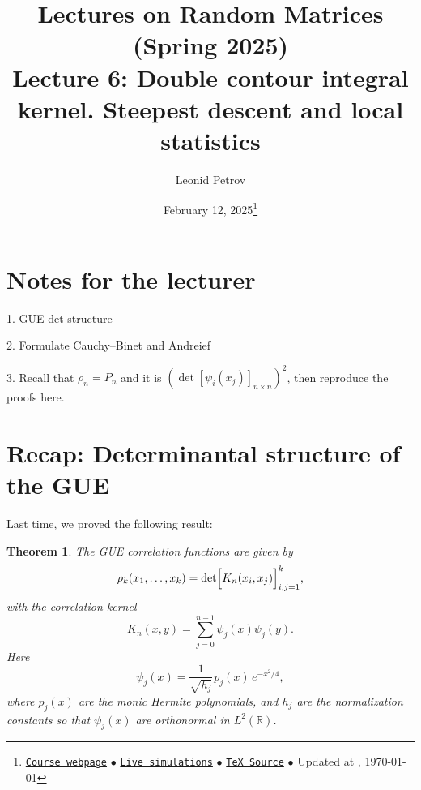 \documentclass[letterpaper,11pt,oneside,reqno]{article}
\numberwithin{equation}{section}
\newcommand{\ssp}{\hspace{1pt}}
\newtheorem{theorem}[proposition]{Theorem}
\theoremstyle{definition}
\newenvironment{lnotes}{\section*{Notes for the lecturer}}{}
\begin{document}
\title{Lectures on Random Matrices
(Spring 2025)
\\Lecture 6: Double contour integral kernel. Steepest descent and local statistics}

\date{February 12, 2025\footnote{\href{https://lpetrov.cc/rmt25/}{\texttt{Course webpage}}
$\bullet$ \href{https://lpetrov.cc/simulations/model/random-matrices/}{\texttt{Live simulations}}
$\bullet$ \href{https://lpetrov.cc/rmt25/rmt25-notes/rmt2025-l06.tex}{\texttt{TeX Source}}
$\bullet$
Updated at \currenttime, \today}}

\author{Leonid Petrov}

\maketitle

\begin{lnotes}
	1. GUE det structure

	2. Formulate Cauchy--Binet and Andreief

	3. Recall that $\rho_n=P_n$ and it is
	$\left( \det[\psi_i(x_j)]_{n\times n} \right)^2$, then reproduce the proofs here.
\end{lnotes}

\section{Recap: Determinantal structure of the GUE}

Last time, we proved the following result:
\begin{theorem}
\label{thm:determinantal_GUE}
The GUE correlation functions are given by
\[
\rho_k(x_1,\dots,x_k)=\det\Bigl[K_n(x_i,x_j)\Bigr]_{i,j=1}^k,
\]
with the correlation kernel
\[
K_n(x,y)=\sum_{j=0}^{n-1}\psi_j(x)\psi_j(y).
\]
Here
\begin{equation*}
	\psi_j(x)=\frac{1}{\sqrt{h_j}}\ssp p_j(x)\,e^{-x^2/4},
\end{equation*}
where \(p_j(x)\) are the monic Hermite polynomials, and \(h_j\) are the normalization constants so that
$\psi_j(x)$ are orthonormal in $L^2(\mathbb{R})$.
\end{theorem}
\end{document}
